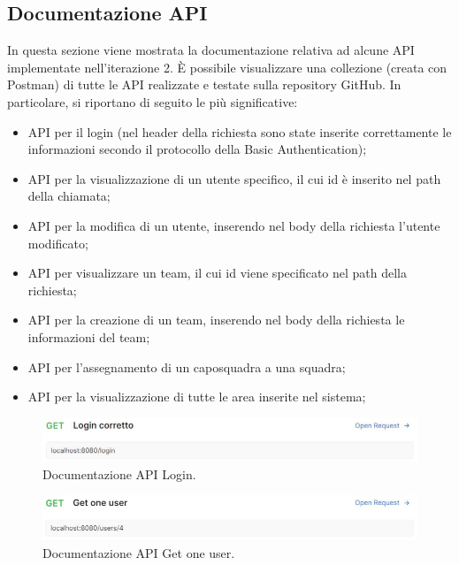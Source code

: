 \subsection{Documentazione API}

In questa sezione viene mostrata la documentazione relativa ad alcune API implementate nell'iterazione 2. \`E possibile visualizzare una collezione (creata con Postman) di tutte le API realizzate e testate sulla repository GitHub. In particolare, si riportano di seguito le più significative:
\begin{itemize}
	\item API per il login (nel header della richiesta sono state inserite correttamente le informazioni secondo il protocollo della Basic Authentication);
	\item API per la visualizzazione di un utente specifico, il cui id è inserito nel path della chiamata;
	\item API per la modifica di un utente, inserendo nel body della richiesta l'utente modificato;
	\item API per visualizzare un team, il cui id viene specificato nel path della richiesta;
	\item API per la creazione di un team, inserendo nel body della richiesta le informazioni del team;
	\item API per l'assegnamento di un caposquadra a una squadra;
	\item API per la visualizzazione di tutte le area inserite nel sistema;
\end{itemize}

\begin{figure}[h!]
	\centering
	\includegraphics[width=1\linewidth]{./Iterazione 2/ImageFiles/LoginCorrettoRequest}
	
	\caption{Documentazione API Login.}
	\label{fig:LoginAPI}
\end{figure}

\begin{figure}[h!]
	\centering
	\includegraphics[width=1\linewidth]{./Iterazione 2/ImageFiles/GetOneUser}
	
	\caption{Documentazione API Get one user.}
	\label{fig:GetOneUserAPI}
\end{figure}

